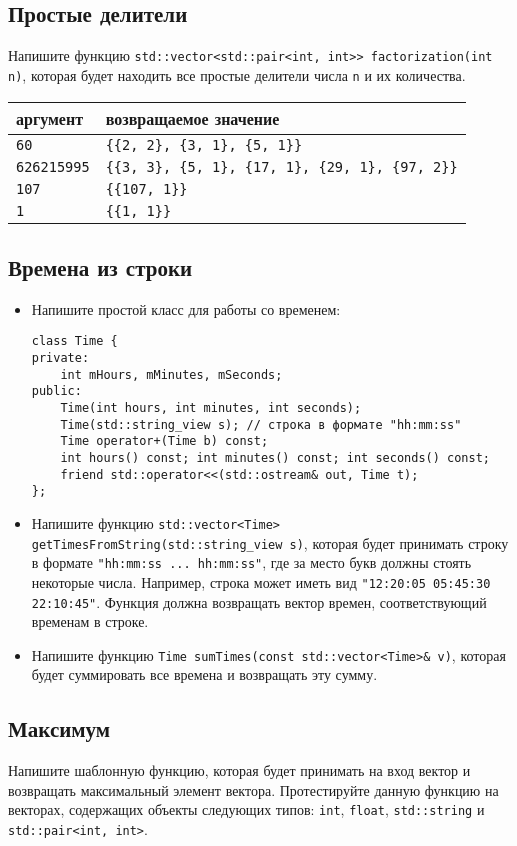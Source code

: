 \documentclass{article}
\begin{document}
\subsection{Простые делители}
Напишите функцию \texttt{std::vector<std::pair<int, int>{}> factorization(int n)}, которая будет находить все простые делители числа \texttt{n} и их количества.
\begin{center}
\begin{tabular}{ l | l }
 аргумент & возвращаемое значение \\ \hline
 \texttt{60} & \texttt{\{\{2, 2\}, \{3, 1\}, \{5, 1\}\}} \\
 \texttt{626215995} & \texttt{\{\{3, 3\}, \{5, 1\}, \{17, 1\}, \{29, 1\}, \{97, 2\}\}} \\
 \texttt{107} & \texttt{\{\{107, 1\}\}} \\
 \texttt{1} & \texttt{\{\{1, 1\}\}} 
\end{tabular}
\end{center}

\subsection{Времена из строки}
\begin{itemize}
\item Напишите простой класс для работы со временем:
\begin{lstlisting}
class Time {
private:
    int mHours, mMinutes, mSeconds;
public:
    Time(int hours, int minutes, int seconds);
    Time(std::string_view s); // строка в формате "hh:mm:ss"
    Time operator+(Time b) const;
    int hours() const; int minutes() const; int seconds() const;
    friend std::operator<<(std::ostream& out, Time t);
};
\end{lstlisting}
\item Напишите функцию \texttt{std::vector<Time> getTimesFromString(std::string\_view s)}, которая будет принимать строку в формате \texttt{"hh:mm:ss ... hh:mm:ss"}, где за место букв должны стоять некоторые числа. Например, строка может иметь вид \texttt{"12:20:05 05:45:30 22:10:45"}. Функция должна возвращать вектор времен, соответствующий временам в строке.\\
\item Напишите функцию \texttt{Time sumTimes(const std::vector<Time>\& v)}, которая будет суммировать все времена и возвращать эту сумму.
\end{itemize}


\subsection{Максимум}
Напишите шаблонную функцию, которая будет принимать на вход вектор и возвращать максимальный элемент вектора.
Протестируйте данную функцию на векторах, содержащих объекты следующих типов: \texttt{int}, \texttt{float}, \texttt{std::string} и \texttt{std::pair<int, int>}.
\end{document}
